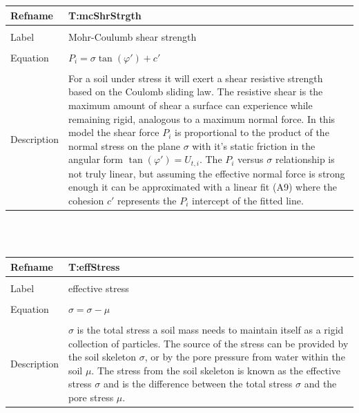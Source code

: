 \documentclass[12pt]{article}
\begin{document}
\noindent \begin{minipage}{\textwidth}
\begin{tabular}{p{} p{}}
\toprule \textbf{Refname} & \textbf{T:mcShrStrgth}
\label{T:mcShrStrgth}
\\ \midrule \\
Label & Mohr-Coulumb shear strength
\\ \midrule \\
Equation & $P_{i}=\sigma{}\tan(\varphi{}')+c'$
\\ \midrule \\
Description & For a soil under stress it will exert a shear resistive strength based on the Coulomb sliding law. The resistive shear is the maximum amount of shear a surface can experience while remaining rigid, analogous to a maximum normal force. In this model the shear force $P_{i}$ is proportional to the product of the normal stress on the plane $\sigma{}$ with it's static friction in the angular form $\tan(\varphi{}')=U_{t,i}$. The $P_{i}$ versus $\sigma{}$ relationship is not truly linear, but assuming the effective normal force is strong enough it can be approximated with a linear fit (A9) where the cohesion $c'$ represents the $P_{i}$ intercept of the fitted line.
\\ \bottomrule \end{tabular}
\end{minipage}\\
~\newline
\noindent \begin{minipage}{\textwidth}
\begin{tabular}{p{} p{}}
\toprule \textbf{Refname} & \textbf{T:effStress}
\label{T:effStress}
\\ \midrule \\
Label & effective stress
\\ \midrule \\
Equation & $\sigma{}=\sigma{}-\mu{}$
\\ \midrule \\
Description & $\sigma{}$ is the total stress a soil mass needs to maintain itself as a rigid collection of particles. The source of the stress can be provided by the soil skeleton $\sigma{}$, or by the pore pressure from water within the soil $\mu{}$. The stress from the soil skeleton is known as the effective stress $\sigma{}$ and is the difference between the total stress $\sigma{}$ and the pore stress $\mu{}$.
\\ \bottomrule \end{tabular}
\end{minipage}\\
\end{document}
